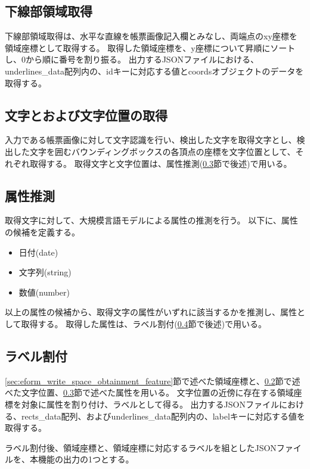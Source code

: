 \subsection{下線部領域取得}\label{subsec:underline_coords_obtainment}
下線部領域取得は、水平な直線を帳票画像記入欄とみなし、両端点のxy座標を領域座標として取得する。
取得した領域座標を、y座標について昇順にソートし、0から順に番号を割り振る。
出力するJSONファイルにおける、underlines\_data配列内の、idキーに対応する値とcoordsオブジェクトのデータを取得する。

\subsection{文字とおよび文字位置の取得}\label{subsec:char_and_bbox_obtainment}
入力である帳票画像に対して文字認識を行い、検出した文字を取得文字とし、検出した文字を囲むバウンディングボックスの各頂点の座標を文字位置として、それぞれ取得する。
取得文字と文字位置は、属性推測(\ref{subsec:att_prediction}節で後述)で用いる。

\subsection{属性推測}\label{subsec:att_prediction}
取得文字に対して、大規模言語モデルによる属性の推測を行う。
以下に、属性の候補を定義する。

\begin{itemize}
    \item 日付(date)
    \item 文字列(string)
    \item 数値(number)
\end{itemize}

以上の属性の候補から、取得文字の属性がいずれに該当するかを推測し、属性として取得する。
取得した属性は、ラベル割付(\ref{subsec:label_link}節で後述)で用いる。

\subsection{ラベル割付}\label{subsec:label_link}
\ref{sec:eform_write_space_obtainment_feature}節で述べた領域座標と、\ref{subsec:char_and_bbox_obtainment}節で述べた文字位置、\ref{subsec:att_prediction}節で述べた属性を用いる。
文字位置の近傍に存在する領域座標を対象に属性を割り付け、ラベルとして得る。
出力するJSONファイルにおける、rects\_data配列、およびunderlines\_data配列内の、labelキーに対応する値を取得する。

ラベル割付後、領域座標と、領域座標に対応するラベルを組としたJSONファイルを、本機能の出力の1つとする。


